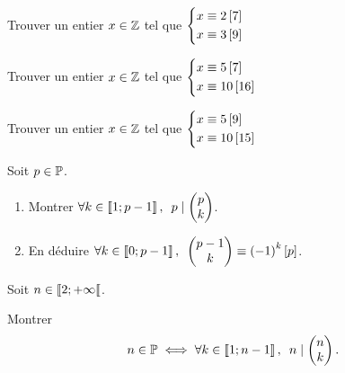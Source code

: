 \begin{corr}
\end{corr}

\begin{exo}
Trouver un entier \(x\in\mathbb{Z}\) tel que \(\begin{dcases}x\equiv2\left[7\right] \\ x\equiv3\left[9\right]\end{dcases}\)
\end{exo}

\begin{corr}
\end{corr}

\begin{exo}
Trouver un entier \(x\in\mathbb{Z}\) tel que \(\begin{dcases}x\equiv5\left[7\right] \\ x\equiv10\left[16\right]\end{dcases}\)
\end{exo}

\begin{corr}
\end{corr}

\begin{exo}
Trouver un entier \(x\in\mathbb{Z}\) tel que \(\begin{dcases}x\equiv5\left[9\right] \\ x\equiv10\left[15\right]\end{dcases}\)
\end{exo}

\begin{corr}
\end{corr}

\begin{exo}
Soit \(p\in\mathbb{P}\).

\begin{enumerate}
\item Montrer \(\quantifs{\forall k\in\interventierii{1}{p-1}}p\divise\binom{k}{p}\). \\

\item En déduire \(\quantifs{\forall k\in\interventierii{0}{p-1}}\binom{k}{p-1}\equiv\paren{-1}^k\croch{p}\).
\end{enumerate}
\end{exo}

\begin{corr}
\end{corr}

\begin{exo}
Soit \(n\in\left\llbracket2;+\infty\right\llbracket\).

Montrer \[n\in\prem\ssi\quantifs{\forall k\in\interventierii{1}{n-1}}n\divise\binom{k}{n}.\]
\end{exo}


